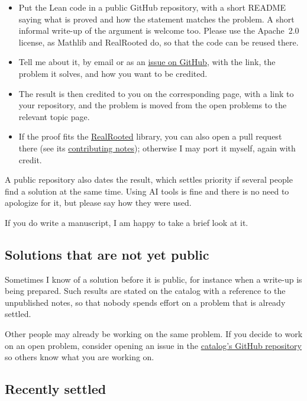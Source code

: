 \begin{itemize}
\item Put the Lean code in a public GitHub repository, with a short README
saying what is proved and how the statement matches the problem.  A short
informal write-up of the argument is welcome too.  Please use the Apache~2.0
license, as Mathlib and RealRooted do, so that the code can be reused there.
\item Tell me about it, by email or as an
\href{https://github.com/PerAlexandersson/symmetricfunctions.com/issues}{issue
on GitHub}, with the link, the problem it solves, and how you want to be
credited.
\item The result is then credited to you on the corresponding page, with a
link to your repository, and the problem is moved from the open problems to
the relevant topic page.
\item If the proof fits the
\href{https://github.com/PerAlexandersson/RealRooted}{RealRooted} library,
you can also open a pull request there (see its
\href{https://github.com/PerAlexandersson/RealRooted\#contributing}{contributing
notes}); otherwise I may port it myself, again with credit.
\end{itemize}
A public repository also dates the result, which settles priority if
several people find a solution at the same time.  Using AI tools is fine and
there is no need to apologize for it, but please say how they were used.

If you do write a manuscript, I am happy to take a brief look at it.

\subsection[aiResearchPending]{Solutions that are not yet public}

Sometimes I know of a solution before it is public, for instance when a
write-up is being prepared.  Such results are stated on the catalog with a
reference to the unpublished notes, so that nobody spends effort on a problem
that is already settled.

Other people may already be working on the same problem. If you decide to
work on an open problem, consider opening an issue in the
\href{https://github.com/PerAlexandersson/symmetricfunctions.com/issues}{
catalog's GitHub repository} so others know what you are working on.

\subsection[aiResearchSolved]{Recently settled}

